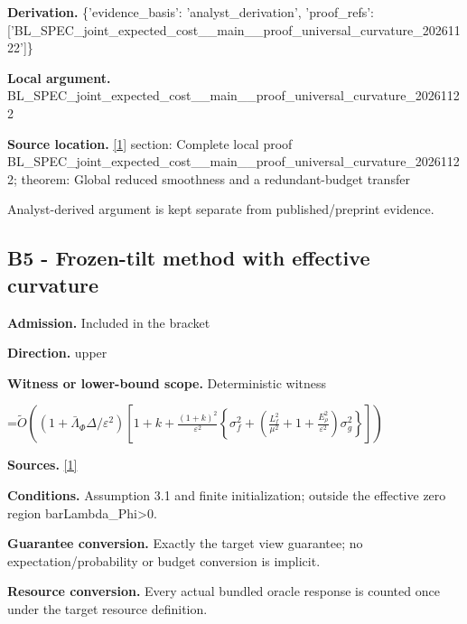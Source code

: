 \documentclass[10pt,a4paper]{article}
\newcommand{\AtlasMath}[1]{\par\begingroup\centering\setbox0=\hbox{$\displaystyle #1$}\ifdim\wd0>1.4\linewidth\typeout{ATLAS WIDE FORMULA: \the\wd0}\fi\ifdim\wd0>\linewidth\resizebox{\linewidth}{!}{\box0}\else\box0\fi\par\endgroup}
\begin{document}
\textbf{Derivation.} \{'evidence\_basis': 'analyst\_derivation', 'proof\_refs': ['BL\_SPEC\_joint\_expected\_c\allowbreak{}ost\_\_main\_\_proof\_univers\allowbreak{}al\_curvature\_20261122']\}



\textbf{Local argument.} BL\_SPEC\_joint\_expected\_c\allowbreak{}ost\_\_main\_\_proof\_univers\allowbreak{}al\_curvature\_20261122



\textbf{Source location.} \href{https://arxiv.org/pdf/2610.03633v2}{[1]} section: Complete local proof BL\_SPEC\_joint\_expected\_c\allowbreak{}ost\_\_main\_\_proof\_univers\allowbreak{}al\_curvature\_20261122; theorem: Global reduced smoothness and a redundant-budget transfer



Analyst-derived argument is kept separate from published/preprint evidence.



\subsection{B5 - Frozen-tilt method with effective curvature}


\textbf{Admission.} Included in the bracket



\textbf{Direction.} upper



\textbf{Witness or lower-bound scope.} Deterministic witness



\AtlasMath{\widetilde O\!\left((1+\bar\Lambda_\Phi\Delta/\varepsilon^2)\left[1+k+\frac{(1+k)^2}{\varepsilon^2}\left\{\sigma_f^2+\left(\frac{L_f^2}{\mu^2}+1+\frac{E_\rho^2}{\varepsilon^2}\right)\sigma_g^2\right\}\right]\right)}


\textbf{Sources.} \href{https://arxiv.org/pdf/2610.03633v2}{[1]}



\textbf{Conditions.} Assumption 3.1 and finite initialization; outside the effective zero region barLambda\_Phi>0.



\textbf{Guarantee conversion.} Exactly the target view guarantee; no expectation/probability or budget conversion is implicit.



\textbf{Resource conversion.} Every actual bundled oracle response is counted once under the target resource definition.
\end{document}
